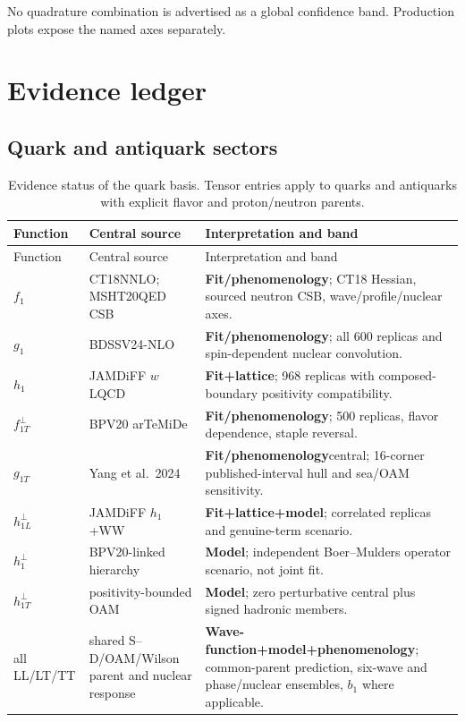 \documentclass[11pt]{article}
\newcommand{\status}[1]{\textsf{\textbf{#1}}}
\newcommand{\fit}{\status{Fit/phenomenology}}
\newcommand{\model}{\status{Model}}
\begin{document}
No quadrature combination is advertised as a global confidence band.
Production plots expose the named axes separately.

\section{Evidence ledger}
\label{sec:evidence}

\subsection{Quark and antiquark sectors}

\begin{longtable}{L{0.18\textwidth}L{0.31\textwidth}L{0.42\textwidth}}
\caption{Evidence status of the quark basis.  Tensor entries apply to quarks
and antiquarks with explicit flavor and proton/neutron parents.}
\label{tab:quark-evidence}\\
\toprule
Function & Central source & Interpretation and band \\
\midrule
\endfirsthead
\toprule
Function & Central source & Interpretation and band \\
\midrule
\endhead
\(f_1\) & CT18NNLO; MSHT20QED CSB &
\fit; CT18 Hessian, sourced neutron CSB, wave/profile/nuclear axes.\\
\(g_1\) & BDSSV24-NLO &
\fit; all 600 replicas and spin-dependent nuclear convolution.\\
\(h_1\) & JAMDiFF \(w\)LQCD &
\status{Fit+lattice}; 968 replicas with composed-boundary positivity
compatibility.\\
\(f_{1T}^{\perp}\) & BPV20 arTeMiDe &
\fit; 500 replicas, flavor dependence, staple reversal.\\
\(g_{1T}\) & Yang et al.\ 2024 &
\fit central; 16-corner published-interval hull and sea/OAM sensitivity.\\
\(h_{1L}^{\perp}\) & JAMDiFF \(h_1\)+WW &
\status{Fit+lattice+model}; correlated replicas and genuine-term scenario.\\
\(h_1^\perp\) & BPV20-linked hierarchy &
\model; independent Boer--Mulders operator scenario, not joint fit.\\
\(h_{1T}^{\perp}\) & positivity-bounded OAM &
\model; zero perturbative central plus signed hadronic members.\\
all LL/LT/TT &
shared S--D/OAM/Wilson parent and nuclear response &
\status{Wave-function+model+phenomenology}; common-parent prediction,
six-wave and phase/nuclear ensembles, \(b_1\) where applicable.\\
\bottomrule
\end{longtable}
\end{document}
